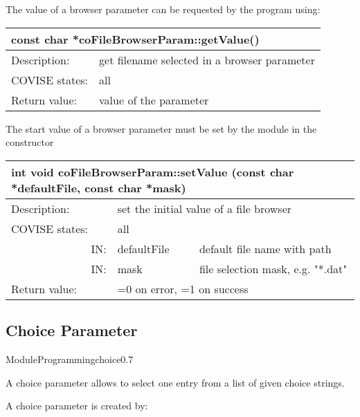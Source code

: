 The value of a browser parameter can be requested by the program using:


\begin{longtable}{|p{4cm}|p{10cm}|}
\hline
\multicolumn{2}{|p{13.5cm}|}{\bf const char *coFileBrowserParam::getValue()} \\
\hline
{Description:}   
                & {get filename selected in a browser parameter} \\
\hline
{COVISE states:} & {all} \\
\hline
{Return value:}  
                        & {value of the parameter} \endhead
\hline
\end{longtable}

The start value of a browser parameter must be set by the module in the constructor

\begin{longtable}{|p{4cm}|p{2.5cm}|p{7cm}|}
\hline
\multicolumn{3}{|p{13.5cm}|}{\bf int void coFileBrowserParam::setValue
(const char *defaultFile, const char *mask)} \\
\hline
{Description:}   
                   & \multicolumn{2}{|p{9.5cm}|}{set the initial value of a file browser} \\
\hline
{COVISE states:} & \multicolumn{2}{|p{9.5cm}|}{all} \\
\hline
\multicolumn{1}{|r|}{IN:} & {defaultFile} 
                            & {default file name with path}\\
\hline
\multicolumn{1}{|r|}{IN:} & {mask} 
                          & {file selection mask, e.g. "*.dat"}\\
\hline
{Return value:}  
                        & \multicolumn{2}{|p{9.5cm}|}{=0 on error, =1 on success} \endhead
\hline
\end{longtable}


\subsection{Choice Parameter}


\begin{covimgpath}{ModuleProgramming}{choice}{0.7}\end{covimgpath}


A choice parameter allows to select one entry from a list of given choice strings.

A choice parameter is created by:


